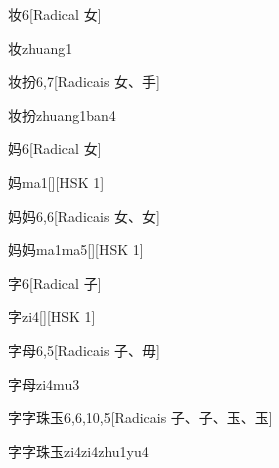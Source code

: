 \begin{entry}{妆}{6}[Radical ⼥]
  \begin{phonetics}{妆}{zhuang1}
  \end{phonetics}
\end{entry}

\begin{entry}{妆扮}{6,7}[Radicais ⼥、⼿]
  \begin{phonetics}{妆扮}{zhuang1ban4}
  \end{phonetics}
\end{entry}

\begin{entry}{妈}{6}[Radical ⼥]
  \begin{phonetics}{妈}{ma1}[][HSK 1]
  \end{phonetics}
\end{entry}

\begin{entry}{妈妈}{6,6}[Radicais ⼥、⼥]
  \begin{phonetics}{妈妈}{ma1ma5}[][HSK 1]
  \end{phonetics}
\end{entry}

\begin{entry}{字}{6}[Radical ⼦]
  \begin{phonetics}{字}{zi4}[][HSK 1]
  \end{phonetics}
\end{entry}

\begin{entry}{字母}{6,5}[Radicais ⼦、⽏]
  \begin{phonetics}{字母}{zi4mu3}
  \end{phonetics}
\end{entry}

\begin{entry}{字字珠玉}{6,6,10,5}[Radicais ⼦、⼦、⽟、⽟]
  \begin{phonetics}{字字珠玉}{zi4zi4zhu1yu4}
  \end{phonetics}
\end{entry}

